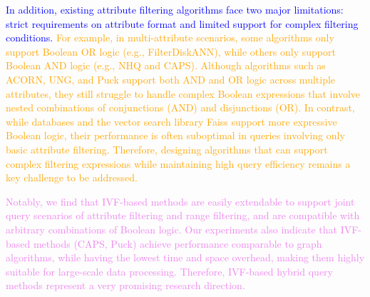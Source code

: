 \documentclass[sigconf, nonacm]{acmart}
\begin{document}
{	\textcolor{blue}{In addition, existing attribute filtering algorithms face two major limitations: strict requirements on attribute format and limited support for complex filtering conditions. }
		\textcolor{orange}{
For example, in multi-attribute scenarios, some algorithms only support Boolean OR logic (e.g., FilterDiskANN), while others only support Boolean AND logic (e.g., NHQ and CAPS). Although algorithms such as ACORN, UNG, and Puck support both AND and OR logic across multiple attributes, they still struggle to handle complex Boolean expressions that involve nested combinations of conjunctions (AND) and disjunctions (OR). In contrast, while databases and the vector search library Faiss support more expressive Boolean logic, their performance is often suboptimal in queries involving only basic attribute filtering.
Therefore, designing algorithms that can support complex filtering expressions while maintaining high query efficiency remains a key challenge to be addressed. }

\textcolor{violet}{Notably, we find that IVF-based methods are easily extendable to support joint query scenarios of attribute filtering and range filtering, and are compatible with arbitrary combinations of Boolean logic. Our experiments also indicate that IVF-based methods (CAPS, Puck) achieve performance comparable to graph algorithms, while having the lowest time and space overhead, making them highly suitable for large-scale data processing. Therefore, IVF-based hybrid query methods represent a very promising research direction.}
		
}
\end{document}
